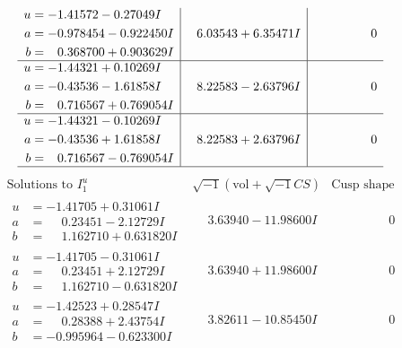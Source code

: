 \documentclass[1p]{elsarticle_modified}
\theoremstyle{definition}
\newcommand{\I}{\sqrt{-1}}
\begin{document}
$$\begin{array}{c|c|c}
\begin{aligned}
u &= -1.41572 - 0.27049 I \\
a &= -0.978454 - 0.922450 I \\
b &= \phantom{-}0.368700 + 0.903629 I\end{aligned}
 & \phantom{-}6.03543 + 6.35471 I & \phantom{-0.000000 } 0 \\ \hline\begin{aligned}
u &= -1.44321 + 0.10269 I \\
a &= -0.43536 - 1.61858 I \\
b &= \phantom{-}0.716567 + 0.769054 I\end{aligned}
 & \phantom{-}8.22583 - 2.63796 I & \phantom{-0.000000 } 0 \\ \hline\begin{aligned}
u &= -1.44321 - 0.10269 I \\
a &= -0.43536 + 1.61858 I \\
b &= \phantom{-}0.716567 - 0.769054 I\end{aligned}
 & \phantom{-}8.22583 + 2.63796 I & \phantom{-0.000000 } 0\\
 \hline 
 \end{array}$$\newpage$$\begin{array}{c|c|c}  
\text{Solutions to }I^u_{1}& \I (\text{vol} + \sqrt{-1}CS) & \text{Cusp shape}\\
 \hline 
\begin{aligned}
u &= -1.41705 + 0.31061 I \\
a &= \phantom{-}0.23451 - 2.12729 I \\
b &= \phantom{-}1.162710 + 0.631820 I\end{aligned}
 & \phantom{-}3.63940 - 11.98600 I & \phantom{-0.000000 } 0 \\ \hline\begin{aligned}
u &= -1.41705 - 0.31061 I \\
a &= \phantom{-}0.23451 + 2.12729 I \\
b &= \phantom{-}1.162710 - 0.631820 I\end{aligned}
 & \phantom{-}3.63940 + 11.98600 I & \phantom{-0.000000 } 0 \\ \hline\begin{aligned}
u &= -1.42523 + 0.28547 I \\
a &= \phantom{-}0.28388 + 2.43754 I \\
b &= -0.995964 - 0.623300 I\end{aligned}
 & \phantom{-}3.82611 - 10.85450 I & \phantom{-0.000000 } 0 \\ \hline\begin{aligned}

\end{aligned}
\end{array}$$
\end{document}

